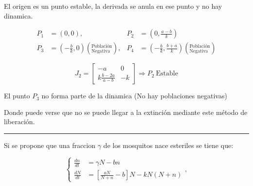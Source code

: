 \documentclass[twocolumn,aps,prl]{revtex4-1}
\newcommand*\sepline{%
  \begin{center}
    \rule[1ex]{.5\textwidth}{.5pt}
  \end{center}}
\begin{document}
El origen es un punto estable, la derivada se anula en ese punto y no hay dinamica.

$$
\begin{aligned}
    P_1 &= (0, 0) , &P_2 &= \left( 0, \frac{a-b}{k} \right) \\ 
    P_3 &= \left(- \frac{b}{k}, 0 \right) \left(^\text{Población}_\text{Negativa} \right) ,  &P_4 &= \left(- \frac{b}{k}, \frac{b+a}{k} \right) \left(^\text{Población}_\text{Negativa} \right)
\end{aligned}
$$



$$
J_2 = 
\begin{bmatrix}
    -a & 0  \\
    k \frac{b - 2a}{ a - b } & -k 
\end{bmatrix}
\Rightarrow  P_2 \ \text{Estable}
$$

El punto $P_3$ no forma parte de la dinamica (No hay poblaciones negativas)


Donde puede verse que no se puede llegar a la extinción mediante este método de liberación.

\sepline

Si se propone que una fraccion $\gamma$ de los mosquitos nace esteriles se tiene que:

\begin{equation}
    \left\lbrace
    \begin{aligned}
        \frac{d n}{d t}&=  \gamma N - b n
        \\
        \frac{d N}{d t}&=\left[\frac{a N}{N+n}-b\right] N- k N(N+n) 
    \end{aligned}
    \right. ,
\end{equation}
\end{document}
